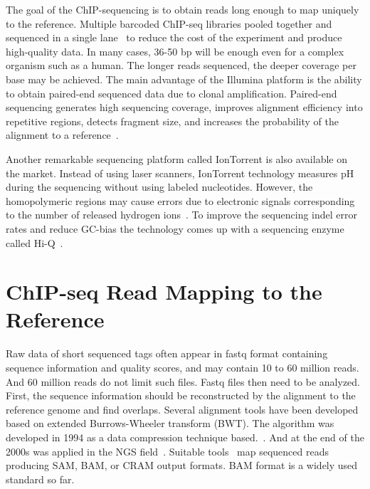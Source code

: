 The goal of the ChIP-sequencing is to obtain reads long enough to map uniquely to the reference. 
Multiple barcoded ChIP-seq libraries pooled together and sequenced in a single lane~\cite{craig2008identification} to reduce the cost of the experiment and produce high-quality data.
In many cases, 36-50 bp will be enough even for a complex organism such as a human. 
The longer reads sequenced, the deeper coverage per base may be achieved.
The main advantage of the Illumina platform is the ability to obtain paired-end sequenced data due to clonal amplification. 
Paired-end sequencing generates high sequencing coverage, improves alignment efficiency into repetitive regions, detects fragment size, and increases the probability of the alignment to a reference~\cite{kidder2011chip, chen2012systematic}.



Another remarkable sequencing platform called IonTorrent is also available on the market. 
Instead of using laser scanners, IonTorrent technology measures pH during the sequencing without using labeled nucleotides. 
However, the homopolymeric regions may cause errors due to electronic signals corresponding to the number of released hydrogen ions~\cite{ambardar2016high}.
To improve the sequencing indel error rates and reduce GC-bias the technology comes up with a sequencing enzyme called Hi-Q~\cite{veras2014efficiency}. 










\section{ChIP-seq Read Mapping to the Reference}

Raw data of short sequenced tags often appear in fastq format containing sequence information and quality scores, and may contain 10 to 60 million reads. 
And 60 million reads do not limit such files.
Fastq files then need to be analyzed. 
First, the sequence information should be reconstructed by the alignment to the reference genome and find overlaps.
Several alignment tools have been developed based on extended Burrows-Wheeler transform (BWT). 
The algorithm was developed in 1994 as a data compression technique based.~\cite{li2009fast, siren2014indexing}.
And at the end of the 2000s was applied in the NGS field~\cite{simpson2010efficient}.
Suitable tools~\cite{langmead2009ultrafast, li2009fast, kim2019graph} map sequenced reads producing  SAM, BAM, or CRAM output formats. 
BAM format is a widely used standard so far.


